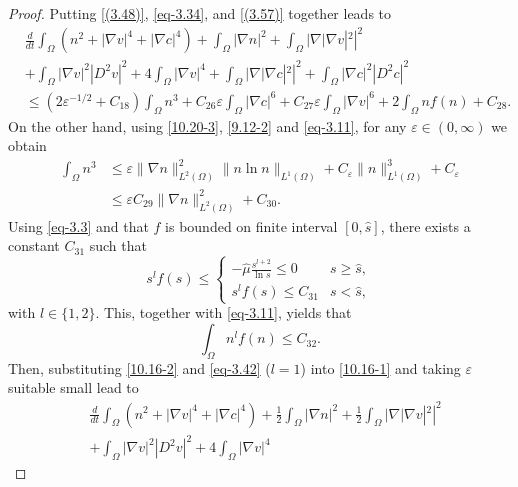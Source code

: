 \documentclass[10pt,a4paper]{amsart}
\numberwithin{equation}{section}
\begin{document}
\begin{proof}
Putting \eqref{(3.48)}, \eqref{eq-3.34}, and \eqref{(3.57)} together leads to
\begin{equation}\label{10.16-1}
\begin{aligned}
&\frac{d}{dt} \int_{\Omega} ( n^2 + |\nabla v|^4 + |\nabla c|^4 )
+ \int_{\Omega} |\nabla n|^2
+  \int_{\Omega} |\nabla |\nabla v|^2|^2 \\
&+ \int_{\Omega} |\nabla v|^2 |D^2 v|^2
+ 4\int_{\Omega} |\nabla v|^4
+  \int_{\Omega} |\nabla |\nabla c|^2|^2
+ \int_{\Omega} |\nabla c|^2 |D^2 c|^2 \\
&\leq (2\varepsilon^{-1/2}+C_{18})\int_{\Omega} n^3
+ C_{26}\varepsilon\int_{\Omega} |\nabla c|^6 + C_{27}\varepsilon\int_{\Omega} 
|\nabla v|^6+ 2\int_{\Omega} nf(n)+C_{28}.
\end{aligned}
\end{equation}
On the other hand, using \eqref{10.20-3}, \eqref{9.12-2} and \eqref{eq-3.11}, for any 
$\varepsilon\in (0,\infty)$ we obtain
\begin{equation}\label{10.16-2}\begin{aligned}
\int_{\Omega} n^3
&\leq \varepsilon \| \nabla n \|_{L^2(\Omega)}^2 \| n\ln n \|_{L^1(\Omega)} 
 + C_\varepsilon \| n \|_{L^1(\Omega)}^3 + C_\varepsilon \\
&\leq \varepsilon C_{29} \| \nabla n \|_{L^2(\Omega)}^2  + C_{30}.
\end{aligned}
\end{equation}
Using \eqref{eq-3.3} and that $ f $ is bounded on finite interval $ [0, \hat{s}] $, 
there exists a constant $ C_{31} $ such that
\[
s^l f(s) \leq
\begin{cases}
-\hat{\mu} \frac{s^{l+2}}{\ln s} \leq 0 & s \geq \hat{s}, \\[3pt]
s^l f(s) \leq C_{31} & s < \hat{s},
\end{cases}
\]
with $l\in \{1,2\}$. This, together with \eqref{eq-3.11}, yields that
\begin{equation}\label{eq-3.42}
\int_{\Omega} n^l f(n) \leq C_{32}.
\end{equation}
Then, substituting \eqref{10.16-2} and \eqref{eq-3.42} ($l=1$) into \eqref{10.16-1} 
and taking $ \varepsilon $ suitable small lead to
\begin{equation}\label{eq-3.43}
\begin{aligned}
&\frac{d}{dt} \int_{\Omega} ( n^2 + |\nabla v|^4 + |\nabla c|^4 )
+ \frac{1}{2}\int_{\Omega} |\nabla n|^2 + \frac{1}{2}\int_{\Omega} |\nabla |\nabla v|^2|^2 \\
&+ \int_{\Omega} |\nabla v|^2 |D^2 v|^2 + 4\int_{\Omega} |\nabla v|^4

\end{aligned}
\end{equation}
\end{proof}
\end{document}
